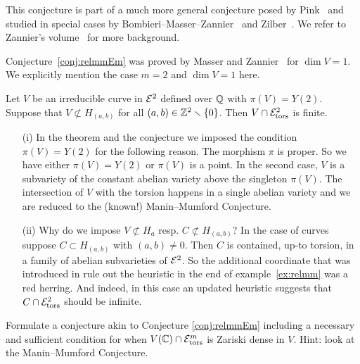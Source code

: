 This conjecture is part of a much more general conjecture posed by
Pink~\cite{Pink} and studied in special cases by
Bombieri--Masser--Zannier~\cite{BMZ,BMZgeometric} and
Zilber~\cite{Zilber}. We refer to Zannier's volume~\cite{ZannierBook}
for more background. 

Conjecture~\ref{conj:relmmEm} was proved by Masser and
Zannier~\cite{MZ:AJM10} for $\dim V = 1$. We explicitly mention the
case $m=2$ and $\dim V=1$ here.

\begin{theorem}
  \label{thm:relmm2}
  Let $V$ be an irreducible curve in ${\mathcal E}^2$ defined over ${\mathbb{Q}}$ with
  $\pi(V)=Y(2)$. Suppose that $V\not\subset H_{(a,b)}$ for all
  $(a,b)\in{\mathbb{Z}}^2\smallsetminus\{0\}$. Then $V\cap {\mathcal E}^2_{\mathrm{tors}}$ is
  finite.
\end{theorem}

\begin{remark}
  \begin{enumerate}
  \item [(i)]In the theorem and the conjecture we imposed the condition
    $\pi(V)=Y(2)$ for the following reason. The morphism $\pi$ is proper.
    So we  have either $\pi(V)=Y(2)$ or $\pi(V)$ is a point. In the second
    case, $V$ is a subvariety of the constant abelian variety above the
    singleton $\pi(V)$. The intersection of $V$ with the torsion happens
    in a single abelian variety and we  are reduced to the (known!)
    Manin--Mumford  Conjecture. 
  \item[(ii)] Why do we impose $V\not\subset H_a$ resp. $C\not\subset
    H_{(a,b)}$? In the case of curves suppose  $C\subset H_{(a,b)}$ with
    $(a,b)\not=0$.
    Then $C$ is contained, up-to torsion, in
    a family of abelian subvarieties of ${\mathcal E}^2$. So the additional
    coordinate that was introduced in rule out the heuristic in the
    end of example~\ref{ex:relmm} was a red herring. And indeed, in this case
    an updated heuristic  suggests that  $C\cap
    {\mathcal E}^2_{\mathrm{tors}}$ should be infinite. 
  \end{enumerate} 
\end{remark}


\begin{exercise} 
  Formulate a conjecture akin to Conjecture \ref{conj:relmmEm} including
  a necessary and  sufficient condition for when $V({\mathbb{C}})\cap
  \mathcal{E}^m_{\mathrm{tors}}$ is Zariski dense in $V$. Hint: look at
  the Manin--Mumford Conjecture. 
\end{exercise}

